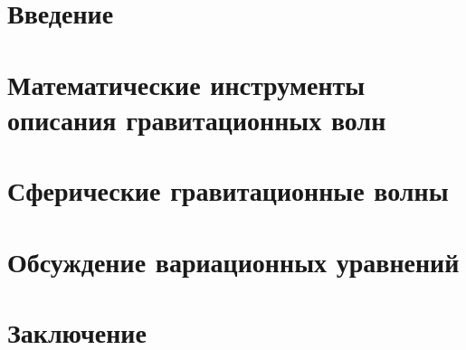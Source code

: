 \documentclass[12pt,a4paper,final]{article}
\def\docroot{../..}
\numberwithin{equation}{section}
\begin{document}
    \makedocroot

    
    \tableofcontents

    \newpage

    \section{Введение}
    

    \section{Математические инструменты описания гравитационных волн}
    

    \section{Сферические гравитационные волны}\label{sec:grav-spher}
    

    \section{Обсуждение вариационных уравнений}
    

    \section{Заключение}
    

    \clearpage

    
    
\end{document}
